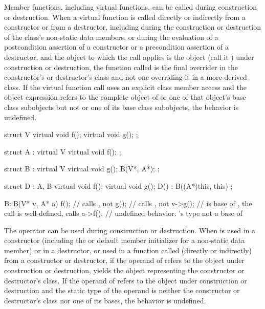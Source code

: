 \pnum
{}%
%
%
%
Member functions, including virtual functions, can be called
during construction or destruction.
When a virtual function is called directly or indirectly from a constructor
or from a destructor,
including during the construction or destruction of the class's non-static data
members,
or during the evaluation of
a postcondition assertion of a constructor or
a precondition assertion of a destructor,
and the object to which the call applies is the object (call it ) under construction or
destruction,
the function called is the
final overrider in the constructor's or destructor's class and not one
overriding it in a more-derived class.
If the virtual function call uses an explicit class member access
and the object expression refers to
the complete object of  or one of that object's base class subobjects
but not  or one of its base class subobjects, the behavior
is undefined.
\begin{example}
\begin{codeblock}
struct V {
  virtual void f();
  virtual void g();
};

struct A : virtual V {
  virtual void f();
};

struct B : virtual V {
  virtual void g();
  B(V*, A*);
};

struct D : A, B {
  virtual void f();
  virtual void g();
  D() : B((A*)this, this) { }
};

B::B(V* v, A* a) {
  f();              // calls , not 
  g();              // calls , not 
  v->g();           //  is base of , the call is well-defined, calls 
  a->f();           // undefined behavior: 's type not a base of 
}
\end{codeblock}
\end{example}

\pnum
{}%
%
%
%
The
operator can be used during construction or destruction.
When
is used in a constructor (including the
 or default member initializer
for a non-static data member)
or in a destructor, or used in a function called (directly or indirectly) from
a constructor or destructor, if the operand of
refers to the object under construction or destruction,
yields the
object representing the constructor or destructor's class.
If the operand of
refers to the object under construction or destruction and the static type of
the operand is neither the constructor or destructor's class nor one of its
bases, the behavior is undefined.

